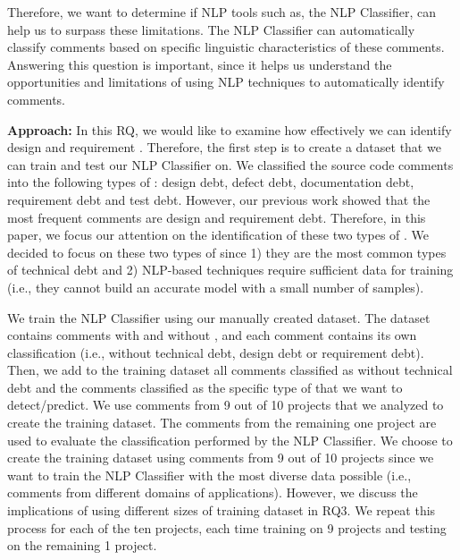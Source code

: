 Therefore, we want to determine if NLP tools such as, the NLP Classifier, can help us to surpass these limitations. The NLP Classifier can automatically classify comments based on specific linguistic characteristics of these comments. Answering this question is important, since it helps us understand the opportunities and limitations of using NLP techniques to automatically identify \SATD comments. 



\vspace{1mm}
\noindent \textbf{Approach:} In this RQ, we would like to examine how effectively we can identify design and requirement \SATD. Therefore, the first step is to create a dataset that we can train and test our NLP Classifier on. We classified the source code comments into the following types of \SATD: design debt, defect debt, documentation debt, requirement debt and test debt. However, our previous work showed that the most frequent \SATD comments are design and requirement debt. Therefore, in this paper, we focus our attention on the identification of these two types of \SATD. We decided to focus on these two types of \SATD since 1) they are the most common types of technical debt and 2) NLP-based techniques require sufficient data for training (i.e., they cannot build an accurate model with a small number of samples).


We train the NLP Classifier using our manually created dataset. The dataset contains comments with and without \SATD, and each comment contains its own classification (i.e., without technical debt, design debt or requirement debt). Then, we add to the training dataset all comments classified as without technical debt and the comments classified as the specific type of \SATD that we want to detect/predict. We use comments from 9 out of 10 projects that we analyzed to create the training dataset. The comments from the remaining one project are used to evaluate the classification performed by the NLP Classifier. We choose to create the training dataset using comments from 9 out of 10 projects since we want to train the NLP Classifier with the most diverse data possible (i.e., comments from different domains of applications). However, we discuss the implications of using different sizes of training dataset in RQ3. We repeat this process for each of the ten projects, each time training on 9 projects and testing on the remaining 1 project.

